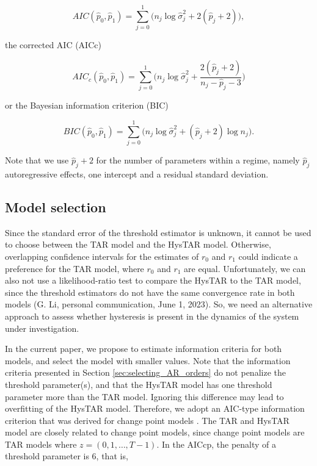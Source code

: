 \documentclass{article}
\begin{document}
\begin{equation}
AIC(\hat{p}_0, \hat{p}_1) = \sum_{j = 0}^{1} \Big(n_j \log \hat{\sigma}_{j}^2 + 2(\hat{p}_j + 2) \Big),
\end{equation}

the corrected AIC (AICc)

\begin{equation}
AIC_c(\hat{p}_0, \hat{p}_1) = \sum_{j = 0}^{1} \Bigg( n_j \log \hat{\sigma}_{j}^2 + 
\frac{2(\hat{p}_j + 2)}{n_j - \hat{p}_j - 3} \Bigg)
\end{equation}

or the Bayesian information criterion (BIC)

\begin{equation}
BIC(\hat{p}_0, \hat{p}_1) = \sum_{j = 0}^{1} \Big( n_j \log \hat{\sigma}_{j}^2 + (\hat{p}_j + 2)  \log n_j \Big).
\end{equation}

Note that we use $\hat{p}_j + 2$ for the number of parameters within a regime, namely $\hat{p}_j$ autoregressive effects, one intercept and a residual standard deviation.

\subsection{Model selection} \label{sec:model_selection}
Since the standard error of the threshold estimator is unknown, it cannot be used to choose between the TAR model and the HysTAR model.
Otherwise, overlapping confidence intervals for the estimates of $r_0$ and $r_1$ could indicate a preference for the TAR model, where $r_0$ and $r_1$ are equal.
Unfortunately, we can also not use a likelihood-ratio test to compare the HysTAR to the TAR model, since the threshold estimators do not have the same convergence rate in both models (G. Li, personal communication, June 1, 2023).
So, we need an alternative approach to assess whether hysteresis is present in the dynamics of the system under investigation.

In the current paper, we propose to estimate information criteria for both models, and select the model with smaller values.
Note that the information criteria presented in Section \ref{sec:selecting_AR_orders} do not penalize the threshold parameter(s), and that the HysTAR model has one threshold parameter more than the TAR model.
Ignoring this difference may lead to overfitting of the HysTAR model.
Therefore, we adopt an AIC-type information criterion that was derived for change point models \citep[AICcp,][]{aiccp}. The TAR and HysTAR model are closely related to change point models, since change point models are TAR models where $z = (0, 1, \dots, T-1)$. In the AICcp, the penalty of a threshold parameter is 6, that is,
\end{document}
